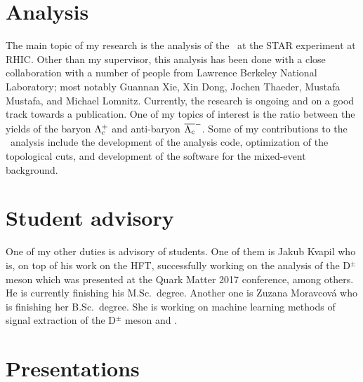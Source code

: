 \section*{Analysis}
The main topic of my research is the analysis of the \Lambdac\ at the STAR experiment at RHIC\@. Other than my supervisor, this analysis has been done with a close collaboration with a number of people from Lawrence Berkeley National Laboratory; most notably Guannan Xie, Xin Dong, Jochen Thaeder, Mustafa Mustafa, and Michael Lomnitz. Currently,
the research is ongoing and on a good track towards a publication. One of my topics of interest is the ratio between the yields of the baryon $\Lambda_\text{c}^+$ and anti-baryon $\overline{\Lambda_\text{c}}^-$. Some of my contributions to the \Lambdac\ analysis include the development of the analysis code, optimization of the topological cuts, and development of the software for the mixed-event background.

\section*{Student advisory}

One of my other duties is advisory of students. One of them is Jakub Kvapil who is, on top of his work on the HFT, successfully working on the analysis of the D$^\pm$ meson which was presented at the Quark Matter 2017 conference, among others. He is currently finishing his M.Sc.\ degree. Another one is Zuzana Moravcová who is finishing her B.Sc.\ degree. She is working on machine learning methods of signal extraction of the D$^\pm$ meson and \Lambdac.

\section*{Presentations}

